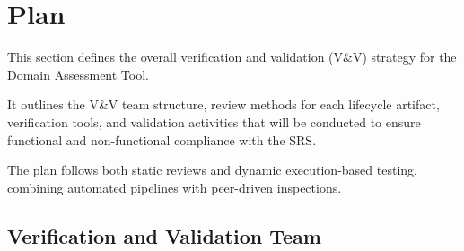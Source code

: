 \documentclass[12pt, titlepage]{article}
\begin{document}
\section{Plan}
\label{sec:plan}
This section defines the overall verification and validation (V\&V) strategy for
the Domain Assessment Tool.

It outlines the V\&V team structure, review methods for each lifecycle artifact,
verification tools, and validation activities that will be conducted to ensure
functional and non-functional compliance with the SRS.

The plan follows both static reviews and dynamic execution-based testing,
combining automated pipelines with peer-driven inspections.

\subsection{Verification and Validation Team}
\label{subsec:vnv-team}
\end{document}
